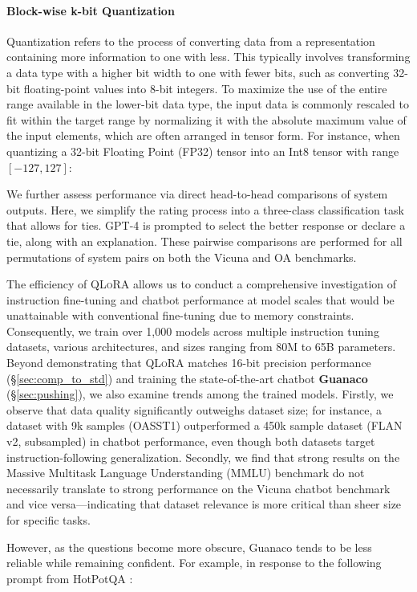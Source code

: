 \paragraph{Block-wise k-bit Quantization} Quantization refers to the process of converting data from a representation containing more information to one with less. This typically involves transforming a data type with a higher bit width to one with fewer bits, such as converting 32-bit floating-point values into 8-bit integers. To maximize the use of the entire range available in the lower-bit data type, the input data is commonly rescaled to fit within the target range by normalizing it with the absolute maximum value of the input elements, which are often arranged in tensor form. For instance, when quantizing a 32-bit Floating Point (FP32) tensor into an Int8 tensor with range $[-127, 127]$:

We further assess performance via direct head-to-head comparisons of system outputs. Here, we simplify the rating process into a three-class classification task that allows for ties. GPT-4 is prompted to select the better response or declare a tie, along with an explanation. These pairwise comparisons are performed for all permutations of system pairs on both the Vicuna and OA benchmarks.

The efficiency of \textsc{QLoRA} allows us to conduct a comprehensive investigation of instruction fine-tuning and chatbot performance at model scales that would be unattainable with conventional fine-tuning due to memory constraints. Consequently, we train over 1,000 models across multiple instruction tuning datasets, various architectures, and sizes ranging from 80M to 65B parameters. Beyond demonstrating that \textsc{QLoRA} matches 16-bit precision performance (\S\ref{sec:comp_to_std}) and training the state-of-the-art chatbot \textbf{Guanaco} (\S\ref{sec:pushing}), we also examine trends among the trained models. Firstly, we observe that data quality significantly outweighs dataset size; for instance, a dataset with 9k samples (OASST1) outperformed a 450k sample dataset (FLAN v2, subsampled) in chatbot performance, even though both datasets target instruction-following generalization. Secondly, we find that strong results on the Massive Multitask Language Understanding (MMLU) benchmark do not necessarily translate to strong performance on the Vicuna chatbot benchmark and vice versa—indicating that dataset relevance is more critical than sheer size for specific tasks.

However, as the questions become more obscure, {Guanaco} tends to be less reliable while remaining confident. For example, in response to the following prompt from HotPotQA \citep{yang2018hotpotqa}:

